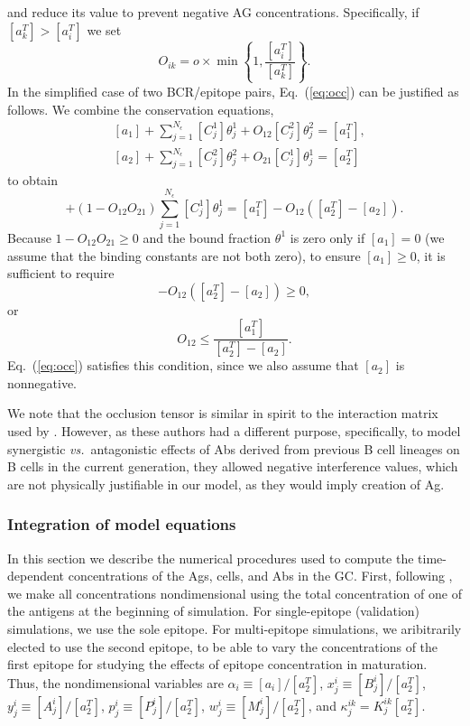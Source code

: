 \documentclass[utf8]{frontiersHLTH}%
\newcommand{\cred}[1]{#1} %
\def\vs {{\it vs.}}
\newcommand{\eq}[1] {Eq.~(\ref{eq:#1})}
\begin{document}
and reduce its value to prevent negative AG concentrations.
Specifically, if $[a^T_k]>[a^T_i]$ we set
\begin{equation}
 O_{ik} = o \times \min\left\{1,\frac{[a^T_i]}{[a^T_k]}\right\}.
 \label{eq:occ}
\end{equation}
In the simplified case of two BCR/epitope pairs, \eq{occ} can be justified as follows.
We combine the conservation equations,
\begin{equation}
 \begin{aligned}
 &[a_1] + \sum^{N_\epsilon}_{j=1} [C^1_j]\theta^1_j + O_{12}[C^2_j]\theta^2_j =[a^T_1],\\
 &[a_2] + \sum^{N_\epsilon}_{j=1} [C^2_j]\theta^2_j + O_{21}[C^1_j]\theta^1_j =[a^T_2]
 \end{aligned}
 \label{eq:ag4}
\end{equation}
to obtain
\begin{equation}
 [a_1] + (1-O_{12}O_{21})\sum^{N_\epsilon}_{j=1} [C^1_j]\theta^1_j = [a^T_1] - O_{12}([a^T_2] - [a_2]).
 \label{eq:ag5}
\end{equation}
Because $1-O_{12}O_{21}\ge0$ and the bound fraction $\theta^1$ is zero only if $[a_1]=0$ (we assume that the binding constants
are not both zero), to ensure $[a_1]\ge0$, it is sufficient to require
\begin{equation}
 [a^T_1] - O_{12}([a^T_2] - [a_2])\ge0,
 \label{eq:ag6}
\end{equation}
or
\begin{equation}
 O_{12}\le\frac{[a^T_1]}{[a^T_2] - [a_2]}.
 \label{eq:ag7}
\end{equation}
\eq{occ} satisfies this condition, since we also assume that $[a_2]$ is nonnegative.

\cred{We note that the occlusion tensor is similar in spirit to the interaction
matrix used by \citet{Yan20}. However, as these authors had a different
purpose, specifically, to model synergistic \vs~antagonistic effects of
Abs derived from previous B cell lineages on B cells in the current
generation, they allowed negative interference values, which are not
physically justifiable in our model, as they would imply creation of Ag.}




\subsubsection{Integration of model equations}
\label{sec:integration}
In this section we describe the numerical procedures used to compute the
time-dependent concentrations of the Ags, cells, and Abs in the GC.
First, following \citet{kepler93}, we make all concentrations
nondimensional using the total concentration of one of the antigens at the beginning of simulation.
For single-epitope (validation) simulations, we use the sole epitope.
For multi-epitope simulations, we aribitrarily elected to use the second epitope,
to be able to vary the concentrations of the first epitope for
studying the effects of epitope concentration in maturation.
Thus, the nondimensional variables are
$\alpha_i\equiv[a_i]/[a_2^T]$, $x^i_j\equiv[B^i_j]/[a_2^T]$,
$y^i_j\equiv[A^i_j]/[a_2^T]$,
$p^i_j\equiv[P^i_j]/[a_2^T]$, $w^i_j\equiv[M^i_j]/[a_2^T]$, and
$\kappa^{ik}_j=K^{ik}_j[a_2^T]$.
\end{document}
